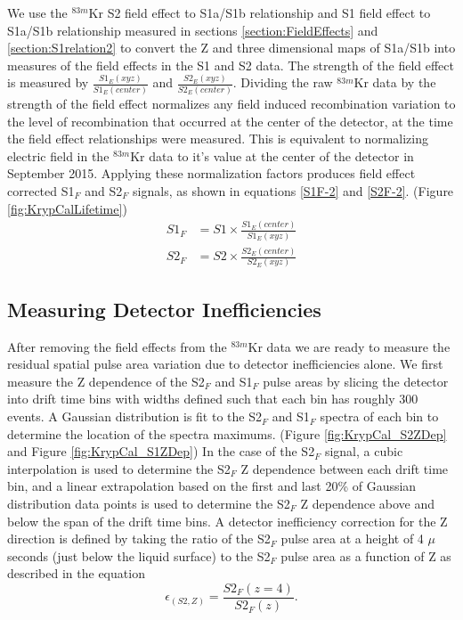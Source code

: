 \documentclass[a4paper,10pt,twocolumn]{article}
\begin{document}
We use the $^{83m}$Kr S2 field effect to S1a/S1b relationship and S1 field effect to S1a/S1b relationship measured in sections \ref{section:FieldEffects} and \ref{section:S1relation2} to convert the Z and three dimensional maps of S1a/S1b into measures of the field effects in the S1 and S2 data.  The strength of the field effect is measured by $\frac{S1_E(xyz)}{S1_E(center)}$ and $\frac{S2_E(xyz)}{S2_E(center)}$.  Dividing the raw $^{83m}$Kr data by the strength of the field effect normalizes any field induced recombination variation to the level of recombination that occurred at the center of the detector, at the time the field effect relationships were measured.  This is equivalent to normalizing electric field in the $^{83m}$Kr data to it's value at the center of the detector in September 2015. Applying these normalization factors produces field effect corrected S1$_F$ and S2$_F$ signals, as shown in equations \ref{S1F-2} and \ref{S2F-2}. (Figure \ref{fig:KrypCalLifetime})
\begin{align} 
S1_F &=S1 \times \frac{S1_E(center)}{S1_E(xyz)} \label{S1F-2} \\
S2_F &=S2 \times \frac{S2_E(center)}{S2_E(xyz)} \label{S2F-2}
\end{align}

\subsection{Measuring Detector Inefficiencies}

After removing the field effects from the $^{83m}$Kr data we are ready to measure the residual spatial pulse area variation due to detector inefficiencies alone.  We first measure the Z dependence of the S2$_F$ and S1$_F$ pulse areas by slicing the detector into drift time bins with widths defined such that each bin has roughly 300 events.  A Gaussian distribution is fit to the S2$_F$ and S1$_F$ spectra of each bin to determine the location of the spectra maximums. (Figure \ref{fig:KrypCal_S2ZDep} and Figure \ref{fig:KrypCal_S1ZDep}) In the case of the S2$_F$ signal, a cubic interpolation is used to determine the S2$_F$ Z dependence between each drift time bin, and a linear extrapolation based on the first and last 20\% of Gaussian distribution data points is used to determine the S2$_F$ Z dependence above and below the span of the drift time bins.  A detector inefficiency correction for the Z direction is defined by taking the ratio of the S2$_F$  pulse area at a height of 4 $\mu$seconds (just below the liquid surface) to the S2$_F$ pulse area as a function of Z as described in the equation
\begin{equation}
\epsilon_{(S2,Z)} = \frac{S2_F(z=4)}{S2_F(z)}.
\end{equation} 
\end{document}
